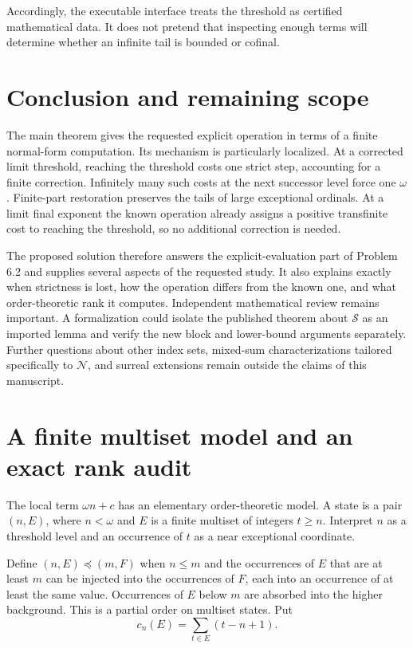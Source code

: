 \documentclass[11pt,letterpaper]{article}
\theoremstyle{definition}
\theoremstyle{remark}
\newcommand{\Nop}{\mathcal N}
\newcommand{\Sop}{\mathcal S}
\begin{document}
Accordingly, the executable interface treats the threshold as certified mathematical data. It does not pretend that inspecting enough terms will determine whether an infinite tail is bounded or cofinal.

\section{Conclusion and remaining scope}

The main theorem gives the requested explicit operation in terms of a finite normal-form computation. Its mechanism is particularly localized. At a corrected limit threshold, reaching the threshold costs one strict step, accounting for a finite correction. Infinitely many such costs at the next successor level force one $\omega$. Finite-part restoration preserves the tails of large exceptional ordinals. At a limit final exponent the known operation already assigns a positive transfinite cost to reaching the threshold, so no additional correction is needed.

The proposed solution therefore answers the explicit-evaluation part of Problem 6.2 and supplies several aspects of the requested study. It also explains exactly when strictness is lost, how the operation differs from the known one, and what order-theoretic rank it computes. Independent mathematical review remains important. A formalization could isolate the published theorem about $\Sop$ as an imported lemma and verify the new block and lower-bound arguments separately. Further questions about other index sets, mixed-sum characterizations tailored specifically to $\Nop$, and surreal extensions remain outside the claims of this manuscript.

\appendix
\section{A finite multiset model and an exact rank audit}\label{app:finite}

The local term $\omega n+c$ has an elementary order-theoretic model. A state is a pair $(n,E)$, where $n<\omega$ and $E$ is a finite multiset of integers $t\ge n$. Interpret $n$ as a threshold level and an occurrence of $t$ as a near exceptional coordinate.

Define $(n,E)\preceq(m,F)$ when $n\le m$ and the occurrences of $E$ that are at least $m$ can be injected into the occurrences of $F$, each into an occurrence of at least the same value. Occurrences of $E$ below $m$ are absorbed into the higher background. This is a partial order on multiset states. Put
\[
 c_n(E)=\sum_{t\in E}(t-n+1).
\]
\end{document}
